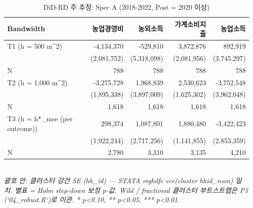 \begin{table}[t]
\centering
\caption{DiD-RD 주 추정: Spec A (2018-2022, Post = 2020 이상)}
\label{tab:main_specA_ko}
\begin{tabular}{lrrrr}
\toprule
Bandwidth & 농업경영비 & 농외소득 & 가계소비지출 & 농업소득 \\
\midrule
T1 (h = 500 m^2) & -4,134,370 & -529,810 & 3,872,876 & 892,919 \\
        & (2,081,752) & (5,318,098) & (2,081,956) & (3,745,297) \\
N       & 788 & 788 & 788 & 788 \\
T2 (h = 1,000 m^2) & -3,275,728 & 1,968,839 & 2,530,623 & -3,752,548 \\
        & (1,895,338) & (3,897,009) & (1,625,302) & (3,962,048) \\
N       & 1,618 & 1,618 & 1,618 & 1,618 \\
T3 (h = h*_mse (per outcome)) & 298,374 & 1,087,801 & 1,880,480 & -3,422,423 \\
        & (1,922,244) & (2,717,256) & (1,141,855) & (2,853,359) \\
N       & 2,780 & 3,310 & 3,135 & 4,210 \\
\bottomrule
\end{tabular}
\\
\footnotesize\textit{괄호 안: 클러스터 강건 SE (hh_id) — STATA reghdfe vce(cluster hhid_num) 일치. 별표 = Holm step-down 보정 p-값. Wild / fractional 클러스터 부트스트랩은 P3 (`04_robust.R`)로 이관. * p<0.10, ** p<0.05, *** p<0.01.}
\end{table}

